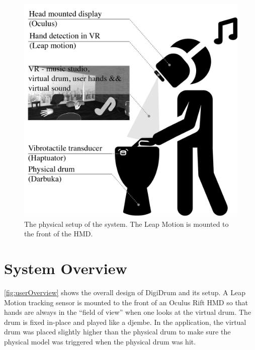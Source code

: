 \documentclass{article}
\begin{document}
\begin{figure}[ht]
\includegraphics[width=1.0\columnwidth]{SMC 2020 paper template LaTeX/Images/VRDrumSetup.png}
\caption{The physical setup of the system. The Leap Motion is mounted to the front of the HMD.}
\centering
\label{fig:userOverview}
\end{figure}

\section{System Overview} \label{sec:sys}

\autoref{fig:userOverview} shows the overall design of DigiDrum and its setup. A Leap Motion tracking sensor is mounted to the front of an Oculus Rift HMD so that hands are always in the ``field of view'' when one looks at the virtual drum. The drum is fixed in-place and played like a djembe. In the application, the virtual drum was placed slightly higher than the physical drum to make sure the physical model was triggered when the physical drum was hit.
\end{document}
